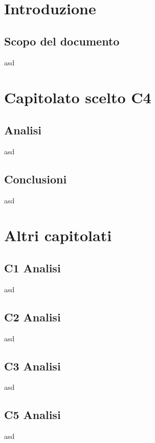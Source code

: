 \section{Introduzione}
\subsection{Scopo del documento}
asd\\

\section{Capitolato scelto C4}
\subsection{Analisi}
asd\\
\subsection{Conclusioni}
asd\\

\section{Altri capitolati}
\subsection{C1 Analisi}
asd\\
\subsection{C2 Analisi}
asd\\
\subsection{C3 Analisi}
asd\\
\subsection{C5 Analisi}
asd\\
